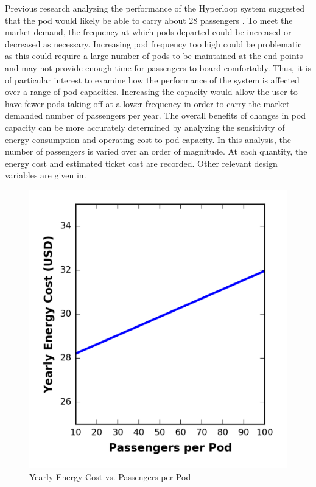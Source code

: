 Previous research analyzing the performance of the Hyperloop system suggested
that the pod would likely be able to carry about 28 passengers \cite{Musk}.
To meet the market demand, the frequency at which pods departed could be
increased or decreased as necessary. Increasing pod frequency too high could be
problematic as this could require a large number of pods to be maintained at
the end points and may not provide enough time for passengers to board comfortably.
Thus, it is of particular interest to examine how the performance of the system
is affected over a range of pod capacities. Increasing the capacity would allow
the user to have fewer pods taking off at a lower frequency in order to carry
the market demanded number of passengers per year. The overall benefits of
changes in pod capacity can be more accurately determined by analyzing the
sensitivity of energy consumption and operating cost to pod capacity.
In this analysis, the number of passengers is varied over an order of magnitude.
At each quantity, the energy cost and estimated ticket cost are recorded.
Other relevant design variables are given in.
\begin{figure}
	\centering
	\includegraphics{../../images/graphs/capacity_trades/passengers_vs_energy.png}
	\caption{Yearly Energy Cost vs. Passengers per Pod}
	\label{fig:energy_cost_vs_passengers}
\end{figure}
